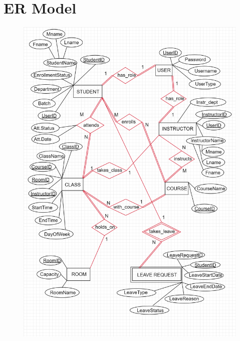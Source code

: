 \documentclass{article}
\begin{document}
\newpage
\section*{\huge{ER Model}}
\thispagestyle{empty}
\begin{figure}[H]
    \centering
    \includegraphics[width=1.1\textwidth, center]{er}
\end{figure}

\newpage
\end{document}

